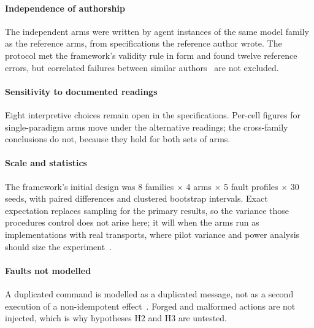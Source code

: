 \paragraph{Independence of authorship} The independent arms were written by agent instances of the same model family as the reference arms, from specifications the reference author wrote. The protocol met the framework's validity rule in form and found twelve reference errors, but correlated failures between similar authors~\cite{knight1986experimental} are not excluded.

\paragraph{Sensitivity to documented readings} Eight interpretive choices remain open in the specifications. Per-cell figures for single-paradigm arms move under the alternative readings; the cross-family conclusions do not, because they hold for both sets of arms.

\paragraph{Scale and statistics} The framework's initial design was 8 families $\times$ 4 arms $\times$ 5 fault profiles $\times$ 30 seeds, with paired differences and clustered bootstrap intervals. Exact expectation replaces sampling for the primary results, so the variance those procedures control does not arise here; it will when the arms run as implementations with real transports, where pilot variance and power analysis should size the experiment~\cite{kalibera2013rigorous,efron1979bootstrap}.

\paragraph{Faults not modelled} A duplicated command is modelled as a duplicated message, not as a second execution of a non-idempotent effect~\cite{helland2012idempotence}. Forged and malformed actions are not injected, which is why hypotheses H2 and H3 are untested.
